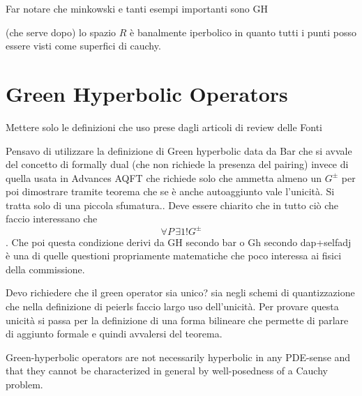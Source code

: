 \documentclass[Main]{subfiles}
\begin{document}
		\begin{Warning}
			Far notare che minkowski e tanti esempi importanti sono GH
		\end{Warning}
		
		\begin{observation}
		(che serve dopo) lo spazio $R$ è banalmente iperbolico in quanto tutti i punti posso essere visti come superfici di cauchy.
		\end{observation}
			
							
			
		\section{Green Hyperbolic Operators}
			\begin{Warning}
				Mettere solo le definizioni che uso prese dagli articoli di review delle Fonti
		\end{Warning}	
					\begin{Warning}
				Pensavo di utilizzare la definizione di Green hyperbolic data da Bar che si avvale del concetto di formally dual (che non richiede la presenza del pairing) invece di quella usata in Advances AQFT che richiede solo che ammetta almeno un $G^\pm$  per poi dimostrare tramite teorema che se è anche autoaggiunto vale l'unicità. Si tratta solo di una piccola sfumatura.. Deve essere chiarito che in tutto ciò che faccio interessano che $$\forall P \, \exists1!G^\pm$$.
				Che poi questa condizione derivi da GH secondo bar o Gh secondo dap+selfadj è una di quelle questioni propriamente matematiche che poco interessa ai fisici della commissione.
			\end{Warning}			
			
			\begin{Warning}
			Devo richiedere che il green operator sia unico? sia negli schemi di quantizzazione che nella definizione di peierls faccio largo uso dell'unicità. 
			Per provare questa unicità si passa per la definizione di una forma bilineare che permette di parlare di aggiunto formale e quindi avvalersi del teorema.
			\end{Warning}
			
		    Green-hyperbolic operators are not necessarily hyperbolic in any PDE-sense and that they cannot be characterized in general by well-posedness of a Cauchy problem. \cite{Terlaky2010} \cite{Bar2010}
		
		
		
				
				
\end{document}
